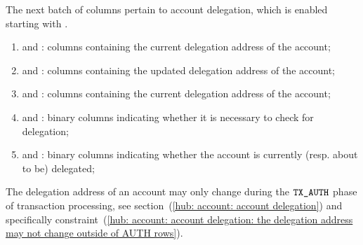 The next batch of columns pertain to account delegation,
which is enabled starting with \cite{EIP-7702}.
\begin{enumerate}[resume]
	\item
		\accDelegationAddressHi{} and \accDelegationAddressLo{}:
		columns containing the current delegation address of the account;
	\item
		\accDelegationAddressHiNew{} and \accDelegationAddressLoNew{}:
		columns containing the updated delegation address of the account;
	\item
		\accDelegationNumber{} and \accDelegationNumberNew{}:
		columns containing the current delegation address of the account;
	\item
		\accCheckForDelegation{} and \accCheckForDelegationNew{}:
		binary columns indicating whether it is necessary to check for delegation;
	\item
		\accIsDelegated{} and \accIsDelegatedNew{}:
		binary columns indicating whether the account is currently (resp. about to be) delegated;
\end{enumerate}
\saNote{}
The delegation address of an account may only change during the $\texttt{TX}\texttt{\_AUTH}{}$ phase of transaction processing,
see section~(\ref{hub: account: account delegation}) and specifically
constraint~(\ref{hub: account: account delegation: the delegation address may not change outside of AUTH rows}).
